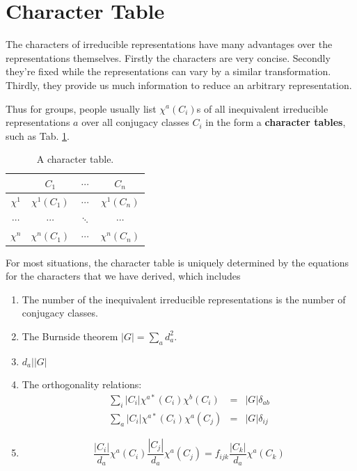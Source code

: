 \documentclass[12pt]{book}
\begin{document}
	\section{Character Table}
	The characters of irreducible representations have many advantages over the representations themselves. Firstly the characters are very concise. Secondly they're fixed while the representations can vary by a similar transformation. Thirdly, they provide us much information to reduce an arbitrary representation.
	
	Thus for groups, people usually list $\chi^a(C_i)$s of all inequivalent irreducible representations $a$ over all conjugacy classes $C_i$ in the form a \textbf{character tables}, such as Tab. \ref{tab:character_table}.
	\begin{table}[htb!]
		\centering
		\begin{tabular}{|c|c|c|c|}
			\hline
			&$C_1$&$\cdots$&$C_n$\\
			\hline
			$\chi^1$&$\chi^1(C_1)$&$\cdots$&$\chi^1(C_n)$\\
			\hline
			$\cdots$&$\cdots$&$\ddots$&$\cdots$\\
			\hline
			$\chi^n$&$\chi^n(C_1)$&$\cdots$&$\chi^n(C_n)$\\
			\hline
		\end{tabular}
		\caption{A character table.}
		\label{tab:character_table}
	\end{table}
	
	For most situations, the character table is uniquely determined by the equations for the characters that we have derived, which includes
	\begin{enumerate}
		\item The number of the inequivalent irreducible representations is the number of conjugacy classes.
		\item The Burnside theorem $|G|=\sum_ad_a^2$.
		\item $d_a\big||G|$
		\item The orthogonality relations:
		\begin{eqnarray}
			\sum_i|C_i|\chi^{a*}(C_i)\chi^b(C_i)&=&|G|\delta_{ab}\label{eqn:orth1}\\
			\sum_a|C_i|\chi^{a*}(C_i)\chi^a(C_j)&=&|G|\delta_{ij}\label{eqn:orth2}
		\end{eqnarray}	
		\item
		\begin{equation}
			\frac{|C_i|}{d_a}\chi^a(C_i)\frac{|C_j|}{d_a}\chi^a(C_j)=f_{ijk}\frac{|C_k|}{d_a}\chi^a(C_k)
		\end{equation}
	\end{enumerate}
	
\end{document}
